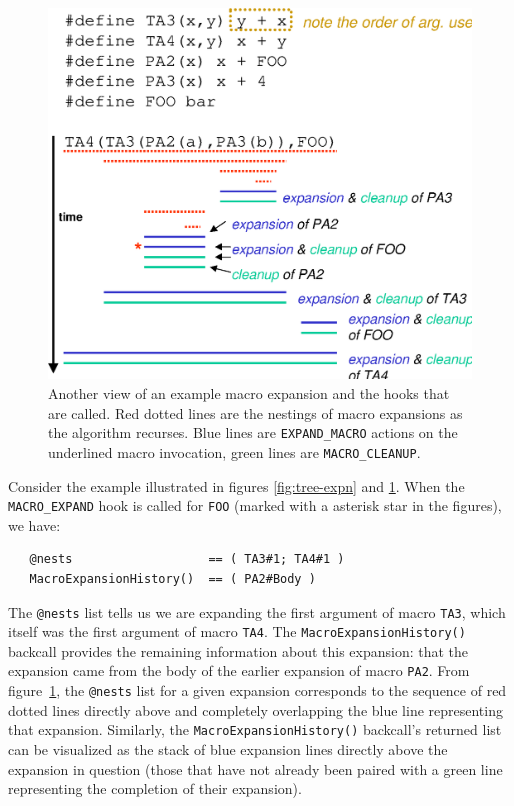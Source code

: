 \documentclass{article}
\begin{document}
\begin{figure}[p]
  \begin{center}
    \leavevmode
    \includegraphics[width=0.45\linewidth]{figs/text-expn.eps}
    \caption{Another view of an example macro expansion and the hooks
    that are called.  Red dotted lines are the nestings of macro
    expansions as the algorithm recurses.  Blue lines are
    \texttt{EXPAND\_MACRO} actions on the underlined macro invocation,
    green lines are \texttt{MACRO\_CLEANUP}.}
    \label{fig:text-expn}
  \end{center}
\end{figure}

Consider the example illustrated in figures \ref{fig:tree-expn} and
\ref{fig:text-expn}.  When the \texttt{MACRO\_EXPAND} hook is called for
\texttt{FOO} (marked with a asterisk star in the figures), we have:

\begin{verbatim}
   @nests                   == ( TA3#1; TA4#1 )
   MacroExpansionHistory()  == ( PA2#Body )
\end{verbatim}

\noindent The \texttt{@nests} list tells us we are expanding the first
argument of macro \texttt{TA3}, which itself was the first argument of
macro \texttt{TA4}.  The \texttt{MacroExpansionHistory()} backcall
provides the remaining information about this expansion: that the
expansion came from the body of the earlier expansion of macro
\texttt{PA2}.  From figure~\ref{fig:text-expn}, the \texttt{@nests} list
for a given expansion corresponds to the sequence of red dotted lines
directly above and completely overlapping the blue line representing
that expansion.  Similarly, the \texttt{MacroExpansionHistory()}
backcall's returned list can be visualized as the stack of blue expansion
lines directly above the expansion in question (those that have not
already been paired with a green line representing the completion of
their expansion).

\end{document}
